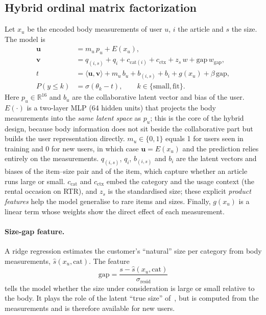 \subsection{Hybrid ordinal matrix factorization}
Let $x_u$ be the encoded body measurements of user $u$, $i$ the article and $s$ the size. The model is
\begin{align}
\mathbf{u} &= m_u\,p_u + E(x_u), \label{eq:user}\\
\mathbf{v} &= q_{(i,s)} + q_i + c_{\mathrm{cat}(i)} + c_{\mathrm{ctx}} + z_s\,w + \mathrm{gap}\,w_{\mathrm{gap}}, \label{eq:item}\\
t &= \langle \mathbf{u}, \mathbf{v}\rangle + m_u\,b_u + b_{(i,s)} + b_i + g(x_u) + \beta\,\mathrm{gap}, \label{eq:score}\\
P(y \le k) &= \sigma(\theta_k - t), \qquad k \in \{\text{small}, \text{fit}\}. \label{eq:ord}
\end{align}
Here $p_u \in \mathbb{R}^{16}$ and $b_u$ are the collaborative latent vector and bias of the user. $E(\cdot)$ is a two-layer MLP (64 hidden units) that projects the body measurements into the \emph{same latent space} as $p_u$; this is the core of the hybrid design, because body information does not sit beside the collaborative part but builds the user representation directly. $m_u \in \{0,1\}$ equals 1 for users seen in training and 0 for new users, in which case $\mathbf{u} = E(x_u)$ and the prediction relies entirely on the measurements. $q_{(i,s)}$, $q_i$, $b_{(i,s)}$ and $b_i$ are the latent vectors and biases of the item--size pair and of the item, which capture whether an article runs large or small. $c_{\mathrm{cat}}$ and $c_{\mathrm{ctx}}$ embed the category and the usage context (the rental occasion on RTR), and $z_s$ is the standardised size; these explicit \emph{product features} help the model generalise to rare items and sizes. Finally, $g(x_u)$ is a linear term whose weights show the direct effect of each measurement.

\paragraph{Size-gap feature.} A ridge regression estimates the customer's ``natural'' size per category from body measurements, $\hat s(x_u, \mathrm{cat})$. The feature
\begin{equation}
\mathrm{gap} = \frac{s - \hat s(x_u, \mathrm{cat})}{\sigma_{\mathrm{resid}}}
\end{equation}
tells the model whether the size under consideration is large or small relative to the body. It plays the role of the latent ``true size'' of~\cite{sembium2017size,misra2018fit}, but is computed from the measurements and is therefore available for new users.


